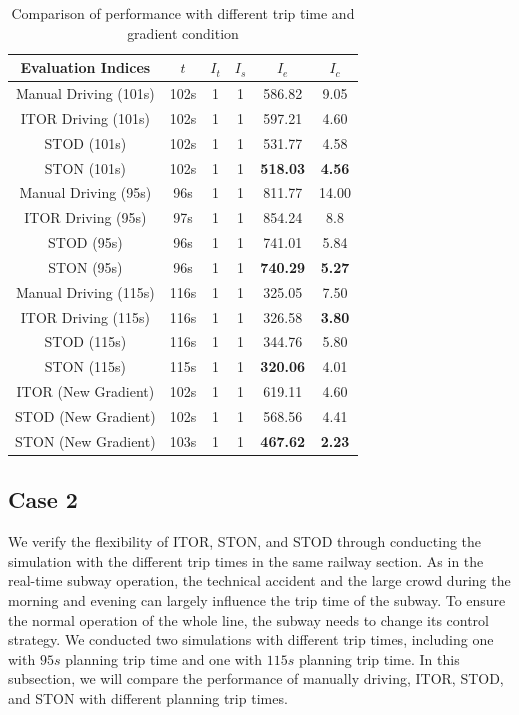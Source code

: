 \documentclass[journal]{IEEEtran}
\begin{document}
\begin{table}[htbp]
	\caption{Comparison of performance with different trip time and gradient condition}
	\begin{center}
		\begin{tabular}{c|c|c|c|c|c}
			\hline
			Evaluation Indices & $t$ & $I_t$ & $I_s$ & $I_e$ & $I_c$ \\
			\hline
            Manual Driving (101s) & 102s & 1 & 1 & 586.82 & 9.05 \\
            ITOR Driving (101s) & 102s & 1 & 1 & 597.21 & 4.60 \\
            STOD (101s) & 102s & 1 & 1 & 531.77 & 4.58 \\ 
            STON (101s) & 102s & 1 & 1 & \textbf{518.03} & \textbf{4.56} \\  
			\hline
			\hline
            Manual Driving (95s) & 96s & 1 & 1 & 811.77 & 14.00 \\
            ITOR Driving (95s) & 97s & 1 & 1 & 854.24 & 8.8 \\
            STOD (95s) & 96s & 1 & 1 & 741.01 & 5.84 \\
            STON (95s) & 96s & 1 & 1 & \textbf{740.29} & \textbf{5.27} \\
			\hline
			\hline
			Manual Driving (115s) & 116s & 1 & 1 & 325.05 & 7.50 \\
            ITOR Driving (115s) & 116s & 1 & 1 & 326.58 & \textbf{3.80} \\
            STOD (115s) & 116s & 1 & 1 & 344.76 & 5.80 \\ 
            STON (115s) & 115s & 1 & 1 & \textbf{320.06} & 4.01 \\  
			\hline
			\hline
			ITOR (New Gradient) & 102s & 1 & 1 & 619.11 & 4.60 \\
			STOD (New Gradient) & 102s & 1 & 1 & 568.56 & 4.41 \\
			STON (New Gradient) & 103s & 1 & 1 & \textbf{467.62} & \textbf{2.23} \\ 
			\hline
		\end{tabular}
		\label{tab2}
	\end{center}
\end{table}   


\subsection{Case 2}
We verify the flexibility of ITOR, STON, and STOD through conducting the simulation with the different trip times in the same railway section. As in the real-time subway operation, the technical accident and the large crowd during the morning and evening can largely influence the trip time of the subway. To ensure the normal operation of the whole line, the subway needs to change its control strategy. We conducted two simulations with different trip times, including one with $95s$ planning trip time and one with $115s$ planning trip time. In this subsection, we will compare the performance of manually driving, ITOR, STOD, and STON with different planning trip times.
\end{document}
